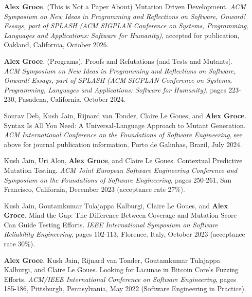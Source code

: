 \documentclass[ComputerScience]{vita}
\begin{document}
\begin{vita}
\begin{Refereed Journal Publications}
\end{Refereed Journal Publications}

\begin{Refereed Conference and Workshop Publications}

 \item 
{\bf Alex Groce}. 
\newblock (This is Not a Paper About) Mutation Driven Development. 
\newblock \emph{ACM Symposium on New Ideas in Programming and 
  Reflections on Software, Onward! Essays, part of SPLASH (ACM SIGPLAN 
  Conference on Systems, Programming, Languages and Applications: 
  Software for Humanity)}, accepted for  publication, Oakland, California, October 2026.
  
 \item 
{\bf Alex Groce}. 
\newblock (Programs), Proofs and Refutations (and Tests and Mutants). 
\newblock \emph{ACM Symposium on New Ideas in Programming and 
  Reflections on Software, Onward! Essays, part of SPLASH (ACM SIGPLAN 
  Conference on Systems, Programming, Languages and Applications: 
  Software for Humanity)}, pages 223-230, Pasadena, California, October 2024.


\item Sourav Deb, Kush Jain, Rijnard van Tonder, Claire Le Goues, and
  {\bf Alex Groce}.
 \newblock  Syntax Is All You Need: A Universal-Language Approach to
 Mutant Generation.
  \newblock \emph{ACM International Conference
on the Foundations of Software Engineering},
see above for journal publication information, Porto de Galinhas, Brazil, July 2024.

\item Kush Jain, Uri Alon, {\bf Alex Groce}, and Claire Le Goues.
    \newblock Contextual Predictive Mutation Testing.
    \newblock \emph{ACM Joint European Software Engineering
Conference and Symposium on the Foundations of Software Engineering},
pages 250-261, San Francisco, California, December 2023  (acceptance rate 27\%).

\item Kush Jain, Goutamkumar Tulajappa Kalburgi, Claire Le Goues, and {\bf Alex Groce}. 
    \newblock Mind the Gap: The Difference Between Coverage and Mutation Score Can Guide Testing Efforts. 
    \newblock \emph{IEEE International Symposium on Software Reliability
  Engineering}, 
pages 102-113, Florence, Italy, October 2023  (acceptance rate 30\%). 


\item {\bf Alex Groce}, Kush Jain, Rijnard van Tonder, Goutamkumar
    Tulajappa Kalburgi, and Claire Le Goues.
    \newblock Looking for Lacunae in Bitcoin Core’s Fuzzing Efforts.
    \newblock \emph{ACM/IEEE International Conference on Software
      Engineering}, pages 185-186, Pittsburgh,
    Pennsylvania, May 2022 (Software Engineering in Practice).
    

\end{Refereed Conference and Workshop Publications}
\end{vita}
\end{document}
